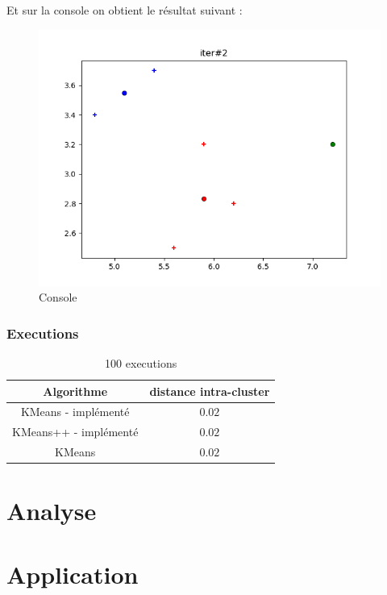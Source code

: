 \documentclass[french]{article}
\begin{document}
Et sur la console on obtient le résultat suivant : 
\begin{figure}[h!]
  \centering
  \includegraphics[width=\linewidth]{img/result-kmeans-final.png}
  \caption{Console}
\end{figure}

\newpage
\subsubsection{Executions}
    \begin{table}[!hbt]
        \begin{center}
        \caption{ 100 executions }
        \label{tab:simParameters}
        \begin{tabular}{|c|c|}
            \hline
           Algorithme & distance intra-cluster   \\
            \hline
           KMeans - implémenté & $0.02$  \\
            \hline
           KMeans++ - implémenté & $0.02$ \\
            \hline      
           KMeans & $0.02$ \\
            \hline
        \end{tabular}
        \end{center}
    \end{table}

\section{Analyse}


\section{Application}
\end{document}
